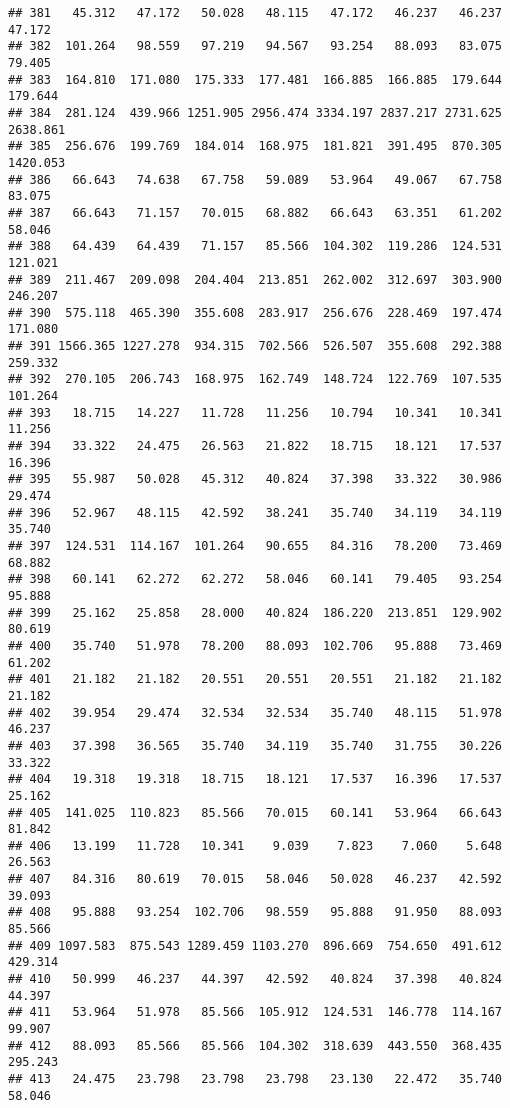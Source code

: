 \documentclass[
]{article}
\begin{document}
\begin{verbatim}
## 381   45.312   47.172   50.028   48.115   47.172   46.237   46.237   47.172
## 382  101.264   98.559   97.219   94.567   93.254   88.093   83.075   79.405
## 383  164.810  171.080  175.333  177.481  166.885  166.885  179.644  179.644
## 384  281.124  439.966 1251.905 2956.474 3334.197 2837.217 2731.625 2638.861
## 385  256.676  199.769  184.014  168.975  181.821  391.495  870.305 1420.053
## 386   66.643   74.638   67.758   59.089   53.964   49.067   67.758   83.075
## 387   66.643   71.157   70.015   68.882   66.643   63.351   61.202   58.046
## 388   64.439   64.439   71.157   85.566  104.302  119.286  124.531  121.021
## 389  211.467  209.098  204.404  213.851  262.002  312.697  303.900  246.207
## 390  575.118  465.390  355.608  283.917  256.676  228.469  197.474  171.080
## 391 1566.365 1227.278  934.315  702.566  526.507  355.608  292.388  259.332
## 392  270.105  206.743  168.975  162.749  148.724  122.769  107.535  101.264
## 393   18.715   14.227   11.728   11.256   10.794   10.341   10.341   11.256
## 394   33.322   24.475   26.563   21.822   18.715   18.121   17.537   16.396
## 395   55.987   50.028   45.312   40.824   37.398   33.322   30.986   29.474
## 396   52.967   48.115   42.592   38.241   35.740   34.119   34.119   35.740
## 397  124.531  114.167  101.264   90.655   84.316   78.200   73.469   68.882
## 398   60.141   62.272   62.272   58.046   60.141   79.405   93.254   95.888
## 399   25.162   25.858   28.000   40.824  186.220  213.851  129.902   80.619
## 400   35.740   51.978   78.200   88.093  102.706   95.888   73.469   61.202
## 401   21.182   21.182   20.551   20.551   20.551   21.182   21.182   21.182
## 402   39.954   29.474   32.534   32.534   35.740   48.115   51.978   46.237
## 403   37.398   36.565   35.740   34.119   35.740   31.755   30.226   33.322
## 404   19.318   19.318   18.715   18.121   17.537   16.396   17.537   25.162
## 405  141.025  110.823   85.566   70.015   60.141   53.964   66.643   81.842
## 406   13.199   11.728   10.341    9.039    7.823    7.060    5.648   26.563
## 407   84.316   80.619   70.015   58.046   50.028   46.237   42.592   39.093
## 408   95.888   93.254  102.706   98.559   95.888   91.950   88.093   85.566
## 409 1097.583  875.543 1289.459 1103.270  896.669  754.650  491.612  429.314
## 410   50.999   46.237   44.397   42.592   40.824   37.398   40.824   44.397
## 411   53.964   51.978   85.566  105.912  124.531  146.778  114.167   99.907
## 412   88.093   85.566   85.566  104.302  318.639  443.550  368.435  295.243
## 413   24.475   23.798   23.798   23.798   23.130   22.472   35.740   58.046

\end{verbatim}
\end{document}
